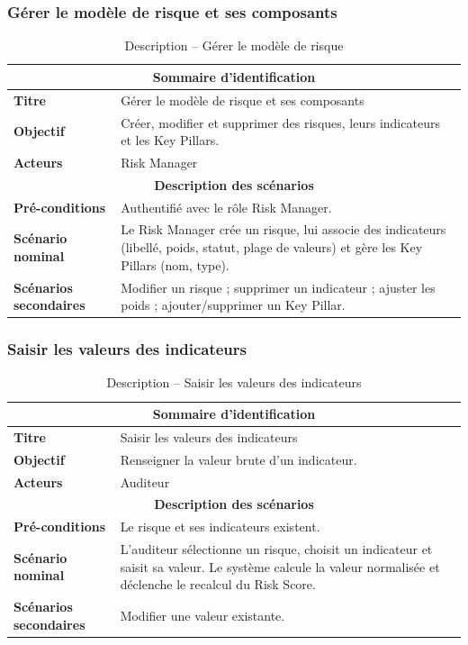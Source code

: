 \subsubsection{Gérer le modèle de risque et ses composants}
\begin{table}[H]
\centering
\renewcommand{\arraystretch}{1.3}
\begin{tabular}{@{}p{}p{}@{}}
\hline
\multicolumn{2}{c}{\textbf{Sommaire d'identification}} \\
\hline
\textbf{Titre} & Gérer le modèle de risque et ses composants \\
\textbf{Objectif} & Créer, modifier et supprimer des risques, leurs indicateurs et les Key Pillars. \\
\textbf{Acteurs} & Risk Manager \\
\hline
\multicolumn{2}{c}{\textbf{Description des scénarios}} \\
\hline
\textbf{Pré-conditions} & Authentifié avec le rôle Risk Manager. \\
\textbf{Scénario nominal} & Le Risk Manager crée un risque, lui associe des indicateurs (libellé, poids, statut, plage de valeurs) et gère les Key Pillars (nom, type). \\
\textbf{Scénarios secondaires} & Modifier un risque ; supprimer un indicateur ; ajuster les poids ; ajouter/supprimer un Key Pillar. \\
\hline
\end{tabular}
\caption{Description -- Gérer le modèle de risque}
\end{table}

\subsubsection{Saisir les valeurs des indicateurs}
\begin{table}[H]
\centering
\renewcommand{\arraystretch}{1.3}
\begin{tabular}{@{}p{}p{}@{}}
\hline
\multicolumn{2}{c}{\textbf{Sommaire d'identification}} \\
\hline
\textbf{Titre} & Saisir les valeurs des indicateurs \\
\textbf{Objectif} & Renseigner la valeur brute d'un indicateur. \\
\textbf{Acteurs} & Auditeur \\
\hline
\multicolumn{2}{c}{\textbf{Description des scénarios}} \\
\hline
\textbf{Pré-conditions} & Le risque et ses indicateurs existent. \\
\textbf{Scénario nominal} & L'auditeur sélectionne un risque, choisit un indicateur et saisit sa valeur. Le système calcule la valeur normalisée et déclenche le recalcul du Risk Score. \\
\textbf{Scénarios secondaires} & Modifier une valeur existante. \\
\hline
\end{tabular}
\caption{Description -- Saisir les valeurs des indicateurs}
\end{table}

